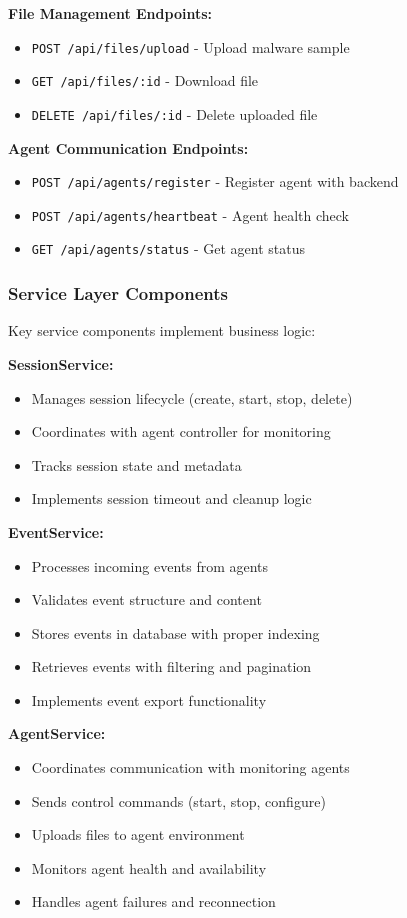 \textbf{File Management Endpoints:}
\begin{itemize}
    \item \texttt{POST /api/files/upload} - Upload malware sample
    \item \texttt{GET /api/files/:id} - Download file
    \item \texttt{DELETE /api/files/:id} - Delete uploaded file
\end{itemize}

\textbf{Agent Communication Endpoints:}
\begin{itemize}
    \item \texttt{POST /api/agents/register} - Register agent with backend
    \item \texttt{POST /api/agents/heartbeat} - Agent health check
    \item \texttt{GET /api/agents/status} - Get agent status
\end{itemize}

\subsubsection{Service Layer Components}

Key service components implement business logic:

\textbf{SessionService:}
\begin{itemize}
    \item Manages session lifecycle (create, start, stop, delete)
    \item Coordinates with agent controller for monitoring
    \item Tracks session state and metadata
    \item Implements session timeout and cleanup logic
\end{itemize}

\textbf{EventService:}
\begin{itemize}
    \item Processes incoming events from agents
    \item Validates event structure and content
    \item Stores events in database with proper indexing
    \item Retrieves events with filtering and pagination
    \item Implements event export functionality
\end{itemize}

\textbf{AgentService:}
\begin{itemize}
    \item Coordinates communication with monitoring agents
    \item Sends control commands (start, stop, configure)
    \item Uploads files to agent environment
    \item Monitors agent health and availability
    \item Handles agent failures and reconnection
\end{itemize}

